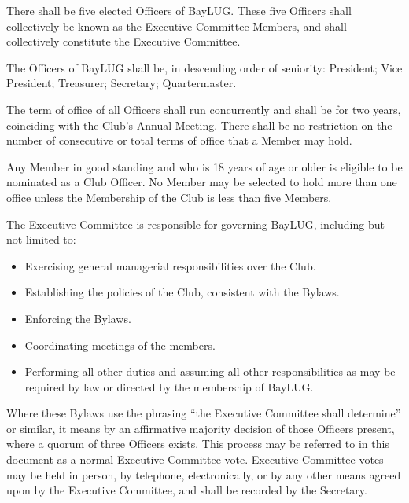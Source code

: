 \documentclass{bylaws}
\begin{document}
\label{art:officers-votes}

\label{sec:exec-committee}
There shall be five elected Officers of BayLUG.  These five Officers shall collectively be known as the Executive Committee Members, and shall collectively constitute the Executive Committee.

The Officers of BayLUG shall be, in descending order of seniority: 
President; 
Vice President; 
Treasurer; 
Secretary; 
Quartermaster.


The term of office of all Officers shall run concurrently and shall be for two years, coinciding with the Club's Annual Meeting. There shall be no restriction on the number of consecutive or total terms of office that a Member may hold. 

Any Member in good standing and who is 18 years of age or older is eligible to be nominated as a Club Officer.  No Member may be selected to hold more than one office unless the Membership of the Club is less than five Members.

The Executive Committee is responsible for governing BayLUG, including but not limited to: 
\begin{itemize}
\item Exercising general managerial responsibilities over the Club.
\item Establishing the policies of the Club, consistent with the Bylaws.
\item Enforcing the Bylaws.
\item Coordinating meetings of the members.
\item Performing all other duties and assuming all other responsibilities as may be required by law or directed by the membership of BayLUG.
\end{itemize}

Where these Bylaws use the phrasing ``the Executive Committee shall determine'' or similar, it means by an affirmative majority decision of those Officers present, where a quorum of three Officers exists. This process may be referred to in this document as a normal Executive Committee vote. Executive Committee votes may be held in person, by telephone, electronically, or by any other means agreed upon by the Executive Committee, and shall be recorded by the Secretary. 
\end{document}
